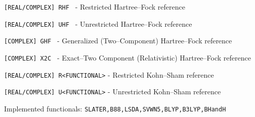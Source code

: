\documentclass[12pt]{article}
\begin{document}
\begin{description}
      \begin{description}
        \item \texttt{[REAL/COMPLEX] RHF    } - Restricted Hartree--Fock reference
        \item \texttt{[REAL/COMPLEX] UHF    } - Unrestricted Hartree--Fock reference
        \item \texttt{[COMPLEX]      GHF    } - Generalized (Two--Component) Hartree--Fock reference
        \item \texttt{[COMPLEX]      X2C    } - Exact--Two Component (Relativistic) Hartree--Fock reference
        \item \texttt{[REAL/COMPLEX] R<FUNCTIONAL>} - Restricted  Kohn--Sham reference
        \item \texttt{[REAL/COMPLEX] U<FUNCTIONAL>} - Unrestricted  Kohn--Sham reference
        \item Implemented functionals: \texttt{SLATER,B88,LSDA,SVWN5,BLYP,B3LYP,BHandH}
      \end{description}
    \end{description}
\end{document}
